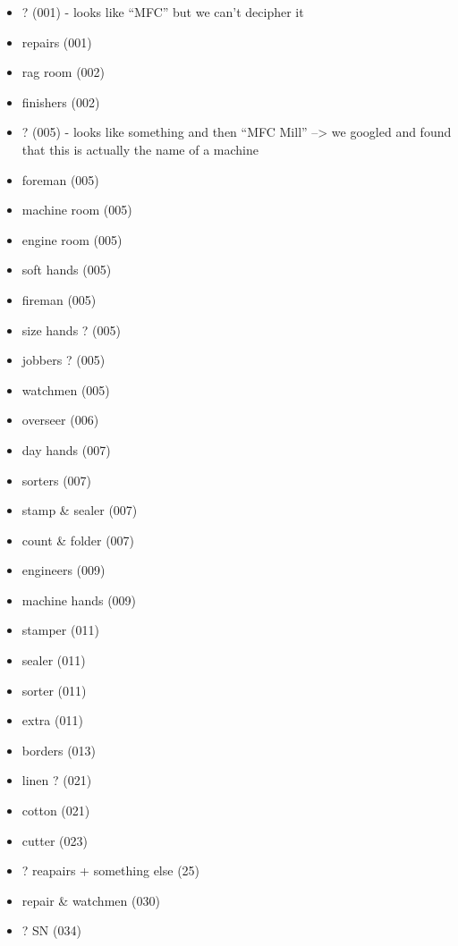 \documentclass[
  letterpaper,
  DIV=11,
  numbers=noendperiod]{scrartcl}
\begin{document}
\begin{itemize}
\item
  ? (001) - looks like ``MFC'' but we can't decipher it
\item
  repairs (001)
\item
  rag room (002)
\item
  finishers (002)
\item
  ? (005) - looks like something and then ``MFC Mill'' --\textgreater{}
  we googled and found that this is actually the name of a machine
\item
  foreman (005)
\item
  machine room (005)
\item
  engine room (005)
\item
  soft hands (005)
\item
  fireman (005)
\item
  size hands ? (005)
\item
  jobbers ? (005)
\item
  watchmen (005)
\item
  overseer (006)
\item
  day hands (007)
\item
  sorters (007)
\item
  stamp \& sealer (007)
\item
  count \& folder (007)
\item
  engineers (009)
\item
  machine hands (009)
\item
  stamper (011)
\item
  sealer (011)
\item
  sorter (011)
\item
  extra (011)
\item
  borders (013)
\item
  linen ? (021)
\item
  cotton (021)
\item
  cutter (023)
\item
  ? reapairs + something else (25)
\item
  repair \& watchmen (030)
\item
  ? SN (034)
\end{itemize}
\end{document}
